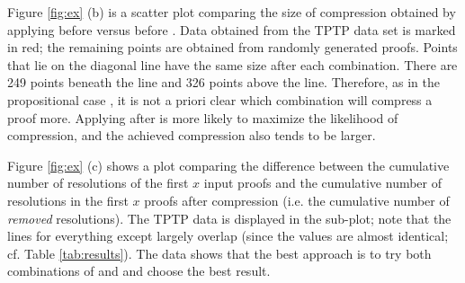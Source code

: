 Figure \ref{fig:ex} (b) is a scatter plot comparing the size of compression obtained by applying {\FORPI} before {\GFOLU} versus {\GFOLU} before {\FORPI}. Data obtained from the TPTP data set is marked in red; the remaining points are obtained from randomly generated proofs. Points that lie on the diagonal line have the same size after each combination. There are 249 points beneath the line and 326 points above the line. Therefore, as in the propositional case \cite{LURPI}, it is not a priori clear which combination will compress a proof more. 
Applying {\FORPI} after {\GFOLU} is more likely to maximize the likelihood of compression, and the achieved compression also tends to be larger.

Figure \ref{fig:ex} (c) shows a plot comparing the difference between the cumulative number of resolutions of the first $x$ input proofs and the cumulative number of resolutions in the first $x$ proofs after compression (i.e. the cumulative number of \emph{removed} resolutions). The TPTP data is displayed in the sub-plot; note that the lines for everything except {\FORPI} largely overlap (since the values are almost identical; cf. Table \ref{tab:results}). The data shows that the best approach is to try both combinations of {\FORPI} and {\GFOLU} and choose the best result.



